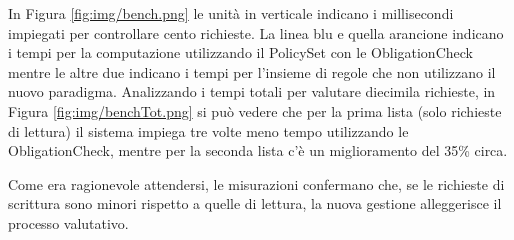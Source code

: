 In Figura \ref{fig:img/bench.png} le unità in verticale indicano i millisecondi impiegati per controllare cento richieste.
La linea blu e quella arancione indicano i tempi per la computazione utilizzando il PolicySet con le ObligationCheck
mentre le altre due indicano i tempi per l'insieme di regole che non utilizzano il nuovo paradigma.
Analizzando i tempi totali per valutare diecimila richieste, in Figura \ref{fig:img/benchTot.png} si può vedere che
per la prima lista (solo richieste di lettura) il sistema impiega tre volte meno tempo utilizzando le ObligationCheck, mentre per la
seconda lista c'è un miglioramento del 35\% circa.

Come era ragionevole attendersi, le misurazioni confermano che, se le richieste di scrittura sono minori rispetto a quelle di lettura, la nuova gestione
alleggerisce il processo valutativo.
